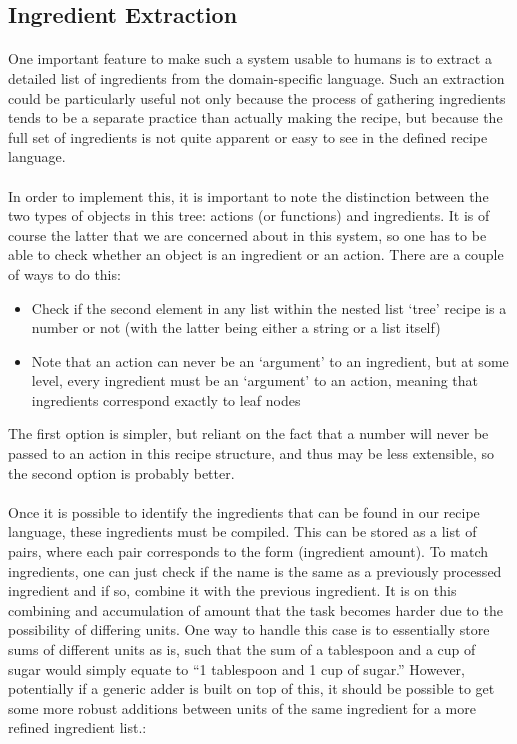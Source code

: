 \subsection{Ingredient Extraction}
\paragraph{}
One important feature to make such a system usable to humans is to extract a detailed list of ingredients from the domain-specific language. Such an extraction could be particularly useful not only because the process of gathering ingredients tends to be a separate practice than actually making the recipe, but because the full set of ingredients is not quite apparent or easy to see in the defined recipe language.

\paragraph{}
In order to implement this, it is important to note the distinction between the two types of objects in this tree: actions (or functions) and ingredients. It is of course the latter that we are concerned about in this system, so one has to be able to check whether an object is an ingredient or an action. There are a couple of ways to do this:
\begin{itemize}
\item Check if the second element in any list within the nested list `tree' recipe is a number or not (with the latter being either a string or a list itself)
\item Note that an action can never be an `argument' to an ingredient, but at some level, every ingredient must be an `argument' to an action, meaning that ingredients correspond exactly to leaf nodes
\end{itemize}

The first option is simpler, but reliant on the fact that a number will never be passed to an action in this recipe structure, and thus may be less extensible, so the second option is probably better.

\paragraph{}
Once it is possible to identify the ingredients that can be found in our recipe language, these ingredients must be compiled. This can be stored as a list of pairs, where each pair corresponds to the form (ingredient amount). To match ingredients, one can just check if the name is the same as a previously processed ingredient and if so, combine it with the previous ingredient. It is on this combining and accumulation of amount that the task becomes harder due to the possibility of differing units. One way to handle this case is to essentially store sums of different units as is, such that the sum of a tablespoon and a cup of sugar would simply equate to ``1 tablespoon and 1 cup of sugar.'' However, potentially if a generic adder is built on top of this, it should be possible to get some more robust additions between units of the same ingredient for a more refined ingredient list.:


